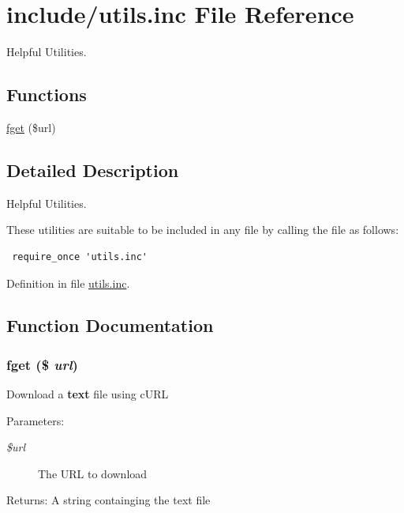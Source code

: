 \hypertarget{utils_8inc}{
\section{include/utils.inc File Reference}
\label{utils_8inc}
}
Helpful Utilities. 

\subsection*{Functions}
\begin{CompactItemize}
\item 
\hyperlink{utils_8inc_846199262ea0cd07e0531f38d26dd9b3}{fget} (\$url)
\end{CompactItemize}


\subsection{Detailed Description}
Helpful Utilities. 

These utilities are suitable to be included in any file by calling the file as follows: 

\begin{Code}\begin{verbatim} require_once 'utils.inc'
\end{verbatim}
\end{Code}

 

Definition in file \hyperlink{utils_8inc-source}{utils.inc}.

\subsection{Function Documentation}
\hypertarget{utils_8inc_846199262ea0cd07e0531f38d26dd9b3}{
\subsubsection{\setlength{\rightskip}{0pt plus 5cm}fget (\$ {\em url})}}
\label{utils_8inc_846199262ea0cd07e0531f38d26dd9b3}


Download a {\bf text} file using cURL \begin{Desc}
\item[Parameters:]
\begin{description}
\item[{\em \$url}]The URL to download \end{description}
\end{Desc}
\begin{Desc}
\item[Returns:]A string containging the text file \end{Desc}


